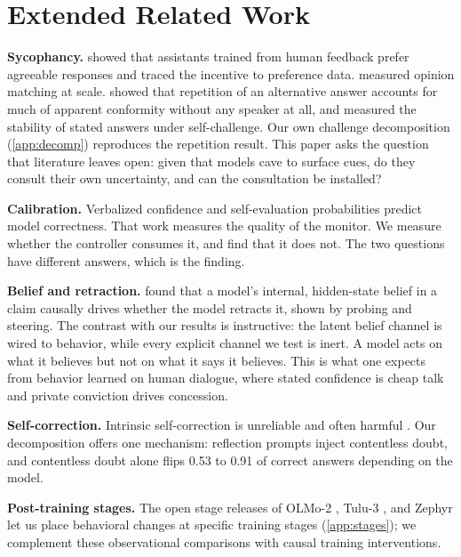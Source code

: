 \documentclass{article}
\begin{document}
\section{Extended Related Work}
\label{app:related}

\textbf{Sycophancy.} \citet{sharma2024sycophancy} showed that assistants trained from human feedback prefer agreeable responses and traced the incentive to preference data. \citet{perez2023discovering} measured opinion matching at scale. \citet{hu2026conformity} showed that repetition of an alternative answer accounts for much of apparent conformity without any speaker at all, and \citet{saadat2026certainty} measured the stability of stated answers under self-challenge. Our own challenge decomposition (\cref{app:decomp}) reproduces the repetition result. This paper asks the question that literature leaves open: given that models cave to surface cues, do they consult their own uncertainty, and can the consultation be installed?

\textbf{Calibration.} Verbalized confidence \citep{lin2022teaching, tian2023just, xiong2024can} and self-evaluation probabilities \citep{kadavath2022language} predict model correctness. That work measures the quality of the monitor. We measure whether the controller consumes it, and find that it does not. The two questions have different answers, which is the finding.

\textbf{Belief and retraction.} \citet{yang2025retraction} found that a model's internal, hidden-state belief in a claim causally drives whether the model retracts it, shown by probing and steering. The contrast with our results is instructive: the latent belief channel is wired to behavior, while every explicit channel we test is inert. A model acts on what it believes but not on what it says it believes. This is what one expects from behavior learned on human dialogue, where stated confidence is cheap talk and private conviction drives concession.

\textbf{Self-correction.} Intrinsic self-correction is unreliable and often harmful \citep{huang2024large}. Our decomposition offers one mechanism: reflection prompts inject contentless doubt, and contentless doubt alone flips 0.53 to 0.91 of correct answers depending on the model.

\textbf{Post-training stages.} The open stage releases of OLMo-2 \citep{olmo2025}, Tulu-3 \citep{lambert2024tulu}, and Zephyr \citep{tunstall2024zephyr} let us place behavioral changes at specific training stages (\cref{app:stages}); we complement these observational comparisons with causal training interventions.
\end{document}
